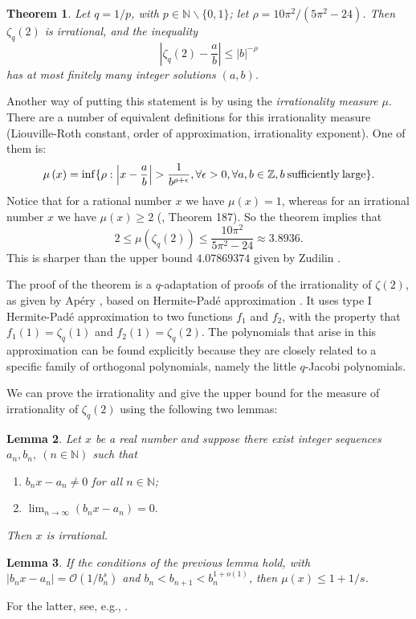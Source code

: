 \documentclass[12pt]{article}
\newtheorem{theorem}{Theorem}[section]
\newtheorem{lemma}[theorem]{Lemma}
\numberwithin{equation}{section}
\begin{document}
\begin{theorem}\label{theo} Let $q=1/p$, with $p\in
\mathbb{N}\backslash\{0,1\}$; let
$\rho=10\pi^2/(5\pi^2-24)$.  Then $\zeta_{q}(2)$
is irrational, and the inequality
\[\left|\zeta_{q}(2)-\frac{a}{b}\right|\leq \left|b\right|^{-\rho}\]
has at most finitely many integer solutions $\left(a,b\right)$.
\end{theorem}

Another way of putting this statement is by using the
\textit{irrationality measure} $\mu$.  There are a number of
equivalent definitions for this irrationality measure
(Liouville-Roth constant, order of approximation, irrationality
exponent). One of them is:
\[\mu\left(x\right)=\inf\{\rho:\left|x-\frac{a}{b}\right|>\frac{1}{b^{\rho+\epsilon}},
 \forall\epsilon>0,\forall a,b \in\mathbb{Z}, b \:\rm{sufficiently}\: \rm{large}\}.\]
Notice that for a rational number $x$ we have $\mu(x)=1$, whereas
for an irrational number $x$ we have $\mu(x)\geq 2$ (\cite{hardy},
Theorem 187). So the theorem implies that
\[  2\leq\mu\left(\zeta_{q}(2)\right)\leq
\frac{10\pi^2}{5\pi^2-24}\approx 3.8936.   \]
This is sharper than the upper bound $4.07869374$ given by Zudilin \cite{zud}.

The proof of the theorem is a $q$-adaptation of proofs of the
irrationality of $\zeta(2)$, as given by Ap\'{e}ry
\cite{Apery}, based on Hermite-Pad\'e approximation \cite{Beukers, wva}.
It uses type I Hermite-Pad\'{e} approximation to two
functions $f_1$ and $f_2$, with the property that
$f_1(1)=\zeta_{q}(1)$ and
$f_2(1)=\zeta_{q}(2)$. The polynomials that
arise in this approximation can be found explicitly because they
are closely related to a specific family of orthogonal polynomials,
namely the little $q$-Jacobi polynomials.

We can prove the irrationality and give the upper bound for the
measure of irrationality of $\zeta_{q}(2)$ using the
following two lemmas:
\begin{lemma} \label{irr}
Let $x$ be a real number and suppose there exist
integer sequences $a_n,b_n,\ (n\in \mathbb{N})$ such that
\begin{enumerate}
    \item $b_nx-a_n\neq 0$ for all $n\in \mathbb{N}$;
    \item $\lim_{n\rightarrow\infty}\left(b_nx-a_n\right)=0.$
\end{enumerate}
Then $x$ is irrational.
\end{lemma}
\begin{lemma}\label{irrmaat}
If the conditions of the previous lemma hold, with
$\left|b_nx-a_n\right|=\mathcal{O}(1/b_n^s)$ and
$b_n<b_{n+1}<b_n^{1+o\left(1\right)}$, then $\mu(x)\leq
1+1/s$.
\end{lemma}
For the latter, see, e.g., \cite[Ex.~3, p.~376]{bor2}.
\end{document}

